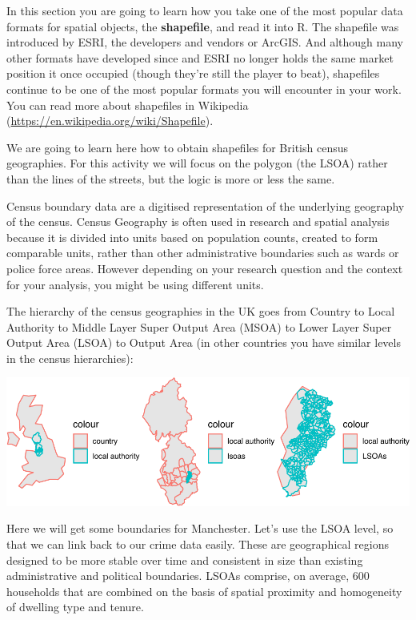\documentclass[
]{book}
\begin{document}
In this section you are going to learn how you take one of the most popular data formats for spatial objects, the \textbf{shapefile}, and read it into R. The shapefile was introduced by ESRI, the developers and vendors or ArcGIS. And although many other formats have developed since and ESRI no longer holds the same market position it once occupied (though they're still the player to beat), shapefiles continue to be one of the most popular formats you will encounter in your work. You can read more about shapefiles in Wikipedia (\url{https://en.wikipedia.org/wiki/Shapefile}).

We are going to learn here how to obtain shapefiles for British census geographies. For this activity we will focus on the polygon (the LSOA) rather than the lines of the streets, but the logic is more or less the same.

Census boundary data are a digitised representation of the underlying geography of the census. Census Geography is often used in research and spatial analysis because it is divided into units based on population counts, created to form comparable units, rather than other administrative boundaries such as wards or police force areas. However depending on your research question and the context for your analysis, you might be using different units.

The hierarchy of the census geographies in the UK goes from Country to Local Authority to Middle Layer Super Output Area (MSOA) to Lower Layer Super Output Area (LSOA) to Output Area (in other countries you have similar levels in the census hierarchies):

\includegraphics{crime_mapping_files/figure-latex/unnamed-chunk-16-1.pdf}

Here we will get some boundaries for Manchester. Let's use the LSOA level, so that we can link back to our crime data easily. These are geographical regions designed to be more stable over time and consistent in size than existing administrative and political boundaries. LSOAs comprise, on average, 600 households that are combined on the basis of spatial proximity and homogeneity of dwelling type and tenure.
\end{document}
